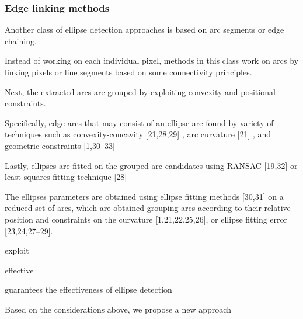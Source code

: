\documentclass[a4paper]{report}
\begin{document}
\subsubsection{Edge linking methods}
Another class of ellipse detection approaches is based on arc segments or edge chaining. 

Instead of working on each individual pixel, methods in this class work on arcs by linking pixels or line segments based on some connectivity principles. 

Next, the extracted arcs are grouped by exploiting convexity and positional constraints.

Specifically, edge arcs that may consist of an ellipse are found by variety of techniques such as
convexity-concavity [21,28,29] , arc curvature [21] , and geometric constraints [1,30–33] 







Lastly, ellipses are fitted on the grouped arc candidates using RANSAC [19,32] or least squares fitting technique [28]

The ellipses parameters are obtained using ellipse fitting methods [30,31] on a reduced set of arcs, which are obtained grouping arcs according to their relative position and constraints on the curvature [1,21,22,25,26], or ellipse fitting error [23,24,27–29].


exploit


effective

%

guarantees the effectiveness of ellipse detection

Based on the considerations above, we propose a new approach
\end{document}
